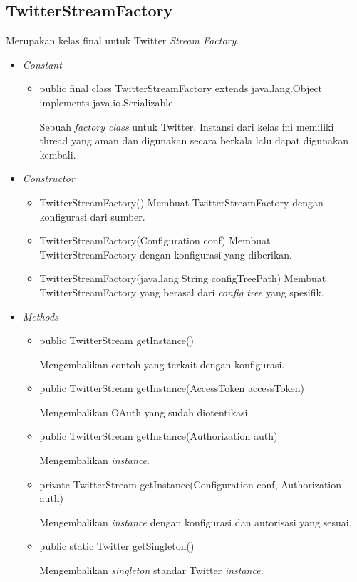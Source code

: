 	\subsection{TwitterStreamFactory}
	Merupakan kelas final untuk Twitter \textit{Stream Factory}.
	\begin{itemize}
		\item \textit{Constant}
		
		\begin{itemize}
			\item public final class TwitterStreamFactory
			extends java.lang.Object
			implements java.io.Serializable
			
			Sebuah \textit{factory class} untuk Twitter. Instansi dari kelas ini memiliki thread yang aman dan digunakan secara berkala lalu dapat digunakan kembali.
		\end{itemize}
		\item \textit{Constructor}
		
		\begin{itemize}
			\item TwitterStreamFactory()
			Membuat TwitterStreamFactory dengan konfigurasi dari sumber.
			\item TwitterStreamFactory(Configuration conf)
			Membuat TwitterStreamFactory dengan konfigurasi yang diberikan.
			\item TwitterStreamFactory(java.lang.String configTreePath)
			Membuat TwitterStreamFactory yang berasal dari \textit{config tree} yang spesifik.
		\end{itemize}
		\item \textit{Methods}
		
		\begin{itemize}
			\item public TwitterStream getInstance()
			
			Mengembalikan contoh yang terkait dengan konfigurasi.
			\item public TwitterStream getInstance(AccessToken accessToken)
			
			Mengembalikan OAuth yang sudah diotentikasi.
			\item public TwitterStream getInstance(Authorization auth)
			
			Mengembalikan \textit{instance}.
			\item private TwitterStream getInstance(Configuration conf, Authorization auth)
			
			Mengembalikan \textit{instance} dengan konfigurasi dan autorisasi yang sesuai.
			\item public static Twitter getSingleton()
			
			Mengembalikan \textit{singleton} standar Twitter \textit{instance}.
		\end{itemize}
	\end{itemize}
	

